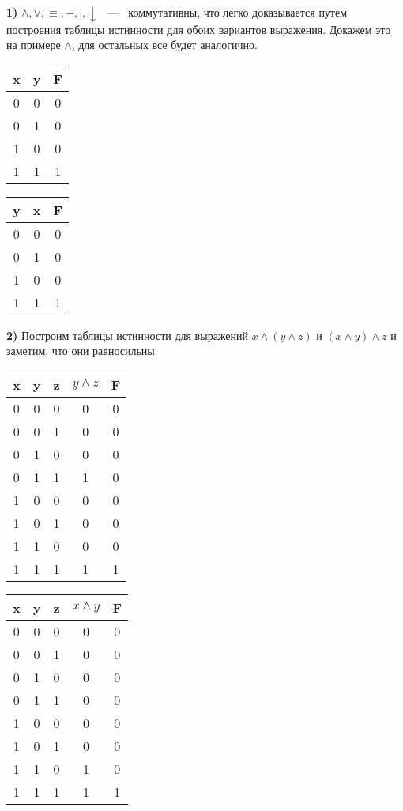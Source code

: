 \documentclass[12pt,a4paper,fleqn]{article}
\begin{document}
{\bf 1)} $ \land, \lor, \equiv, +, |, \downarrow$ ~---~ коммутативны, что легко доказывается путем построения таблицы истинности для обоих вариантов выражения. Докажем это на примере $ \land $, для остальных все будет аналогично.\newline


\begin{tabular}{| c | c | c |}   
\hline
x & y & F \\ \hline
0 & 0 & 0 \\
0 & 1 & 0 \\
1 & 0 & 0 \\
1 & 1 & 1\\
\hline
\end{tabular} 
\quad
\begin{tabular}{| c | c | c |}   
\hline
y & x & F \\ \hline
0 & 0 & 0 \\
0 & 1 & 0 \\
1 & 0 & 0 \\
1 & 1 & 1\\
\hline
\end{tabular}\newline


{\bf 2)} Построим таблицы истинности для выражений $x \land (y \land z)$ и 
\newline
$(x \land y) \land z$ и заметим, что они равносильны \newline


\begin{tabular}{| c | c | c | c | c |}   
\hline
x & y & z & $y \land z$ & F\\ \hline
0 & 0 & 0 & 0 & 0 \\
0 & 0 & 1 & 0 & 0 \\
0 & 1 & 0 & 0 & 0 \\
0 & 1 & 1 & 1 & 0 \\
1 & 0 & 0 & 0 & 0 \\
1 & 0 & 1 & 0 & 0 \\
1 & 1 & 0 & 0 & 0 \\
1 & 1 & 1 & 1 & 1 \\
\hline
\end{tabular}
\quad
\begin{tabular}{| c | c | c | c | c |}   
\hline
x & y & z & $x \land y$ & F\\ \hline
0 & 0 & 0 & 0 & 0 \\
0 & 0 & 1 & 0 & 0 \\
0 & 1 & 0 & 0 & 0 \\
0 & 1 & 1 & 0 & 0 \\
1 & 0 & 0 & 0 & 0 \\
1 & 0 & 1 & 0 & 0 \\
1 & 1 & 0 & 1 & 0 \\
1 & 1 & 1 & 1 & 1 \\
\hline
\end{tabular} \newline
\end{document}
